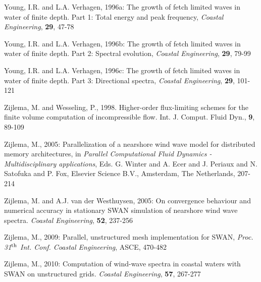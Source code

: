 \documentclass[12pt]{book}
\begin{document}
\begin{thebibliography}{10}
Young, I.R. and L.A. Verhagen, 1996a: The growth of fetch limited waves in water of finite depth. Part 1:
Total energy and peak frequency, {\it Coastal Engineering}, {\bf 29}, 47-78

Young, I.R. and L.A. Verhagen, 1996b: The growth of fetch limited waves in water of finite depth. Part 2:
Spectral evolution, {\it Coastal Engineering}, {\bf 29}, 79-99

Young, I.R. and L.A. Verhagen, 1996c: The growth of fetch limited waves in water of finite depth. Part 3:
Directional spectra, {\it Coastal Engineering}, {\bf 29}, 101-121

Zijlema, M. and Wesseling, P., 1998. Higher-order flux-limiting schemes for the finite volume
  computation of incompressible flow. Int. J. Comput. Fluid Dyn., {\bf 9}, 89-109

Zijlema, M., 2005: Parallelization of a nearshore wind wave model for distributed memory architectures,
in {\it Parallel Computational Fluid Dynamics - {M}ultidisciplinary applications},
Eds. G. Winter and A. Ecer and J. Periaux and N. Satofuka and P. Fox,
Elsevier Science B.V., Amsterdam, The Netherlands, 207-214

Zijlema, M. and A.J. van der Westhuysen, 2005: On convergence behaviour and numerical accuracy in stationary
SWAN simulation of nearshore wind wave spectra. {\it Coastal Engineering}, {\bf 52}, 237-256

Zijlema, M., 2009: Parallel, unstructured mesh implementation for SWAN,
{\it Proc. 31$^{{\rm th}}$ Int. Conf. Coastal Engineering}, ASCE, 470-482

Zijlema, M., 2010: Computation of wind-wave spectra in coastal waters with SWAN on unstructured grids.
{\it Coastal Engineering}, {\bf 57}, 267-277

\end{thebibliography}
\end{document}
